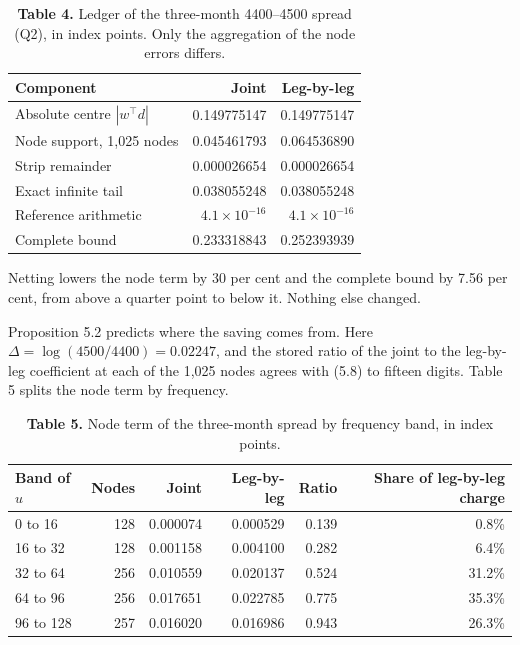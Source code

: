 \documentclass[11pt,a4paper]{article}
\begin{document}
\begin{table}[H]
\caption*{\textbf{Table 4.} Ledger of the three-month 4400–4500 spread (Q2), in index points. Only the aggregation of the node errors differs.}
\centering\small
\begin{tabular}{@{}lrr@{}}
\toprule
Component & Joint & Leg-by-leg \\
\midrule
Absolute centre \(|w^\top d|\) & 0.149775147 & 0.149775147 \\
Node support, 1,025 nodes & 0.045461793 & 0.064536890 \\
Strip remainder & 0.000026654 & 0.000026654 \\
Exact infinite tail & 0.038055248 & 0.038055248 \\
Reference arithmetic & \(4.1\times10^{-16}\) & \(4.1\times10^{-16}\) \\
Complete bound & 0.233318843 & 0.252393939 \\
\bottomrule
\end{tabular}
\end{table}

Netting lowers the node term by 30 per cent and the complete bound by 7.56 per cent, from above a quarter point to below it. Nothing else changed.

Proposition 5.2 predicts where the saving comes from. Here \(\Delta=\log(4500/4400)=0.02247\), and the stored ratio of the joint to the leg-by-leg coefficient at each of the 1,025 nodes agrees with (5.8) to fifteen digits. Table 5 splits the node term by frequency.

\begin{table}[H]
\caption*{\textbf{Table 5.} Node term of the three-month spread by frequency band, in index points.}
\centering\small
\begin{tabular}{@{}lrrrrr@{}}
\toprule
Band of \(u\) & Nodes & Joint & Leg-by-leg & Ratio & Share of leg-by-leg charge \\
\midrule
0 to 16 & 128 & 0.000074 & 0.000529 & 0.139 & 0.8\% \\
16 to 32 & 128 & 0.001158 & 0.004100 & 0.282 & 6.4\% \\
32 to 64 & 256 & 0.010559 & 0.020137 & 0.524 & 31.2\% \\
64 to 96 & 256 & 0.017651 & 0.022785 & 0.775 & 35.3\% \\
96 to 128 & 257 & 0.016020 & 0.016986 & 0.943 & 26.3\% \\
\bottomrule
\end{tabular}
\end{table}
\end{document}
